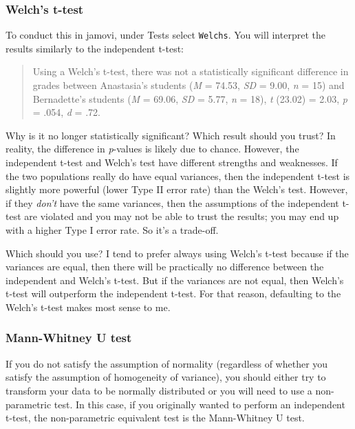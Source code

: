 \documentclass[
]{book}
\begin{document}
\hypertarget{welchs-t-test}{%
\subsubsection{Welch's t-test}\label{welchs-t-test}}

To conduct this in jamovi, under Tests select \texttt{Welch\textquotesingle{}s}. You will interpret the results similarly to the independent t-test:

\begin{quote}
Using a Welch's t-test, there was not a statistically significant difference in grades between Anastasia's students (\emph{M} = 74.53, \emph{SD} = 9.00, \emph{n} = 15) and Bernadette's students (\emph{M} = 69.06, \emph{SD} = 5.77, \emph{n} = 18), \emph{t} (23.02) = 2.03, \emph{p} = .054, \emph{d} = .72.
\end{quote}

Why is it no longer statistically significant? Which result should you trust? In reality, the difference in \emph{p}-values is likely due to chance. However, the independent t-test and Welch's test have different strengths and weaknesses. If the two populations really do have equal variances, then the independent t-test is slightly more powerful (lower Type II error rate) than the Welch's test. However, if they \emph{don't} have the same variances, then the assumptions of the independent t-test are violated and you may not be able to trust the results; you may end up with a higher Type I error rate. So it's a trade-off.

Which should you use? I tend to prefer always using Welch's t-test because if the variances are equal, then there will be practically no difference between the independent and Welch's t-test. But if the variances are not equal, then Welch's t-test will outperform the independent t-test. For that reason, defaulting to the Welch's t-test makes most sense to me.

\hypertarget{mann-whitney-u-test}{%
\subsubsection{Mann-Whitney U test}\label{mann-whitney-u-test}}

If you do not satisfy the assumption of normality (regardless of whether you satisfy the assumption of homogeneity of variance), you should either try to transform your data to be normally distributed or you will need to use a non-parametric test. In this case, if you originally wanted to perform an independent t-test, the non-parametric equivalent test is the Mann-Whitney U test.
\end{document}
